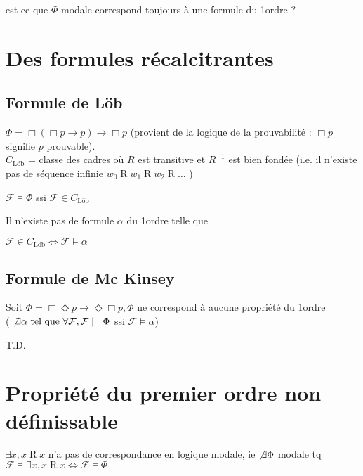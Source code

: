 \documentclass[10pt,a4paper]{article}
\newcommand{\F}{\mathcal{F}}
\DeclareMathOperator{\Ro}{R}
\begin{document}
\begin{ques}
 est ce que $\Phi$ modale correspond toujours à une formule du 1\ier ordre ? 
\end{ques}

\section{Des formules récalcitrantes}

\subsection{Formule de Löb}
$\Phi = \Box ( \Box p \rightarrow p) \rightarrow \Box p$
(provient de la logique de la prouvabilité : $\Box p$ signifie $p$ prouvable).\\
$C_{\text{Löb}}$ = classe des cadres où $R$ est transitive et $R^{-1}$ est bien fondée (i.e. il n'existe pas de séquence infinie $w_0   \Ro w_1   \Ro w_2   \Ro \dots$ )

\begin{prop}
$ \F \models \Phi$ ssi $\F \in C_{\text{Löb}}$
\end{prop}
\begin{dem}
 
\end{dem}

\begin{prop}
 Il n'existe pas de formule $\alpha$ du 1\ier ordre telle que

$\F \in C_{\text{Löb}} \Leftrightarrow \F \models \alpha$
\end{prop}
\begin{dem}
 
\end{dem}

\subsection{Formule de Mc Kinsey}
\begin{prop}
 Soit $\Phi = \Box \Diamond p \rightarrow \Diamond \Box p, \Phi$ ne correspond à aucune propriété du 1\ier ordre \\( $\not \exists \alpha  \tq \forall \F, \F \models \Phi$ ssi $\F \models \alpha$)
\end{prop}

\begin{dem}
 T.D.
\end{dem}


\section{Propriété du premier ordre non définissable}
\begin{prop}
 $\exists x, x   \Ro x$ n'a pas de correspondance en logique modale, ie $\not \exists \Phi$ modale tq $\F \models \exists x, x   \Ro x \Leftrightarrow \F \models \Phi$
\end{prop}
\end{document}
